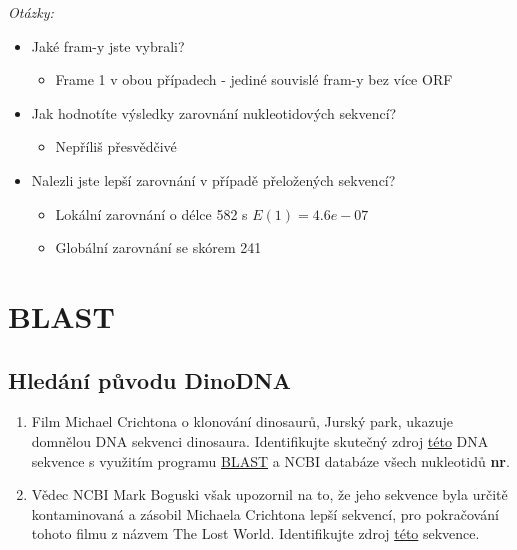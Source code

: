 \documentclass[11pt]{article}
\begin{document}
\emph{Otázky:}
\begin{itemize}
\item Jaké fram-y jste vybrali?
\begin{itemize}
\item Frame 1 v obou případech - jediné souvislé fram-y bez více ORF
\end{itemize}
\item Jak hodnotíte výsledky zarovnání nukleotidových sekvencí?
\begin{itemize}
\item Nepříliš přesvědčivé
\end{itemize}
\item Nalezli jste lepší zarovnání v případě přeložených sekvencí?
\begin{itemize}
\item Lokální zarovnání o délce 582 s \(E(1) = 4.6e-07\)
\item Globální zarovnání se skórem 241
\end{itemize}
\end{itemize}

\section{BLAST}
\label{sec:org3667f81}
\subsection{Hledání původu DinoDNA}
\label{sec:org3f17fa2}
\begin{enumerate}
\item Film Michael Crichtona o klonování dinosaurů, Jurský park, ukazuje domnělou
DNA sekvenci dinosaura. Identifikujte skutečný zdroj \href{data/dino\_dna1.fasta}{této} DNA sekvence s
využitím programu \href{https://blast.ncbi.nlm.nih.gov/Blast.cgi?PROGRAM=blastn\&PAGE\_TYPE=BlastSearch\&LINK\_LOC=blasthome}{BLAST} a NCBI databáze všech nukleotidů \textbf{nr}.
\item Vědec NCBI Mark Boguski však upozornil na to, že jeho sekvence byla určitě
kontaminovaná a zásobil Michaela Crichtona lepší sekvencí, pro pokračování
tohoto filmu z názvem The Lost World. Identifikujte zdroj \href{data/dino\_dna2.fasta}{této} sekvence.
\end{enumerate}
\end{document}
